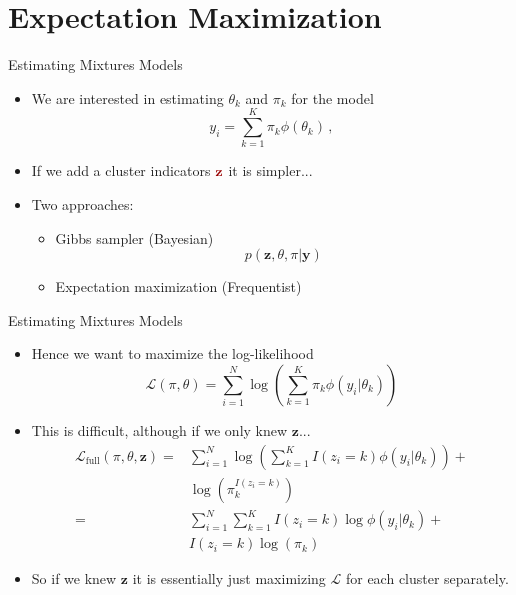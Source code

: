 \documentclass[10pt]{beamer}
\begin{document}
\section{Expectation Maximization}


\begin{frame}{Estimating Mixtures Models}

\begin{itemize}
\item We are interested in estimating $\theta_k$ and $\pi_k$ for the model
\[
y_i = \sum_{k=1}^K \pi_k \phi(\theta_k)\,,
\]
\item If we add a cluster indicators $\uured{\mathbf{z}}$ it is simpler...
\pause
\item Two approaches:
  \begin{itemize}
  \item Gibbs sampler (Bayesian)
  \[
  p(\mathbf{z}, \theta, \pi|\mathbf{y})
  \]
  \pause
  \item Expectation maximization (Frequentist)
\end{itemize}
\end{itemize}


\end{frame}


\begin{frame}{Estimating Mixtures Models}

\begin{itemize}
\item Hence we want to maximize the log-likelihood
\[
\mathcal{L}(\pi, \theta) = \sum^N_{i=1} \log \left( \sum_{k=1}^K \pi_k \phi(y_i|\theta_k)\right)
\]
\item This is difficult, although {\color{uured} if we only knew $\mathbf{z}$}...\pause
\begin{align*}
\mathcal{L}_{\text{full}}(\pi, \theta, \mathbf{z}) =& \sum^N_{i=1} \log \left( \sum_{k=1}^K I(z_i=k) \phi(y_i|\theta_k)\right) + \\
& \log(\pi_k^{I(z_i=k)})\\
=& \sum^N_{i=1} \sum_{k=1}^K I(z_i=k) \log \phi(y_i|\theta_k) + \\
& I(z_i=k) \log(\pi_k)
\end{align*}
\item So if we knew $\mathbf{z}$ it is essentially just maximizing $\mathcal{L}$ for each cluster separately.

\end{itemize}

\end{frame}
\end{document}

